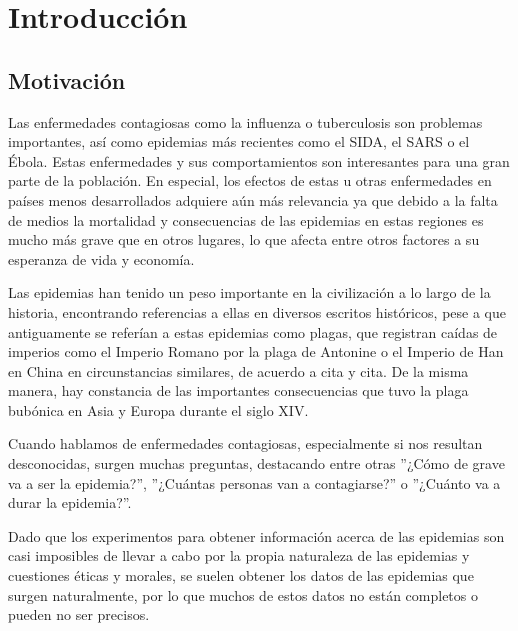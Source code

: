 
\chapter{Introducción}

\section{Motivación}

Las enfermedades contagiosas como la influenza o tuberculosis son problemas importantes, así como epidemias más recientes como el SIDA, el SARS o el Ébola. Estas enfermedades y sus comportamientos son interesantes para una gran parte de la población. En especial, los efectos de estas u otras enfermedades en países menos desarrollados adquiere aún más relevancia ya que debido a la falta de medios la mortalidad y consecuencias de las epidemias en estas regiones es mucho más grave que en otros lugares, lo que afecta entre otros factores a su esperanza de vida y economía.

Las epidemias han tenido un peso importante en la civilización a lo largo de la historia, encontrando referencias a ellas en diversos escritos históricos, pese a que antiguamente se referían a estas epidemias como plagas, que registran caídas de imperios como el Imperio Romano por la plaga de Antonine o el Imperio de Han en China en circunstancias similares, de acuerdo a cita y cita. De la misma manera, hay constancia de las importantes consecuencias que tuvo la plaga bubónica en Asia y Europa durante el siglo XIV.

Cuando hablamos de enfermedades contagiosas, especialmente si nos resultan desconocidas, surgen muchas preguntas, destacando entre otras ''¿Cómo de grave va a ser la epidemia?'', ''¿Cuántas personas van a contagiarse?'' o ''¿Cuánto va a durar la epidemia?''.

Dado que los experimentos para obtener información acerca de las epidemias son casi imposibles de llevar a cabo por la propia naturaleza de las epidemias y cuestiones éticas y morales, se suelen obtener los datos de las epidemias que surgen naturalmente, por lo que muchos de estos datos no están completos o pueden no ser precisos.


